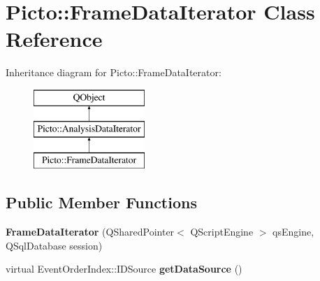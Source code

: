 \hypertarget{class_picto_1_1_frame_data_iterator}{\section{Picto\-:\-:Frame\-Data\-Iterator Class Reference}
\label{class_picto_1_1_frame_data_iterator}
}
Inheritance diagram for Picto\-:\-:Frame\-Data\-Iterator\-:\begin{figure}[H]
\begin{center}
\leavevmode
\includegraphics[height=3.000000cm]{class_picto_1_1_frame_data_iterator}
\end{center}
\end{figure}
\subsection*{Public Member Functions}
\begin{DoxyCompactItemize}
\item 
\hypertarget{class_picto_1_1_frame_data_iterator_a36cb85df6afdeec79f84ab492783b5ca}{{\bfseries Frame\-Data\-Iterator} (Q\-Shared\-Pointer$<$ Q\-Script\-Engine $>$ qs\-Engine, Q\-Sql\-Database session)}\label{class_picto_1_1_frame_data_iterator_a36cb85df6afdeec79f84ab492783b5ca}

\item 
\hypertarget{class_picto_1_1_frame_data_iterator_a8df51a88320d5cc1c9ec3930991d529f}{virtual Event\-Order\-Index\-::\-I\-D\-Source {\bfseries get\-Data\-Source} ()}\label{class_picto_1_1_frame_data_iterator_a8df51a88320d5cc1c9ec3930991d529f}

\end{DoxyCompactItemize}
